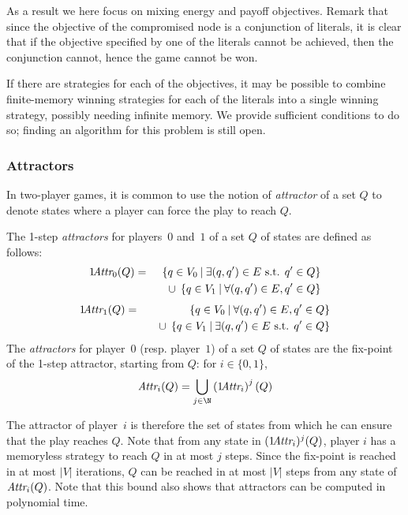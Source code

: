 As a result we here focus on mixing energy and payoff objectives.
Remark that since the objective of the compromised node is a conjunction of literals, it is clear that if the objective specified by one of the literals cannot be achieved, then the conjunction cannot, hence the game cannot be won.

If there are strategies for each of the objectives, it may be possible to combine finite-memory winning strategies for each of the literals into a single winning strategy, possibly needing infinite memory.
We provide sufficient conditions to do so; finding an algorithm for this problem is still open.

\subsubsection{Attractors}

In two-player games, it is common to use the notion of \emph{attractor} of a set $Q$ to denote states where a player can force the play to reach $Q$.

\begin{definition}
The 1-step \emph{attractors} for players~$0$ and~$1$ of a set $Q$ of states are defined as follows:
\begin{eqnarray*}
1\!\textit{Attr}_{0}(Q) &=& \left\{q \in V_0 \:\middle|\: \exists (q,q') \in E \textrm{ s.t. } q' \in Q \right\}
\\&&\quad
\cup \;\left\{q \in V_1 \:\middle|\: \forall (q,q') \in E, q' \in Q \right\}
\end{eqnarray*}
\begin{eqnarray*}
1\!\textit{Attr}_{1}(Q) &=& \left\{q \in V_0 \:\middle|\: \forall (q,q') \in E, q' \in Q \right\}
\\&&\quad
\cup \;\left\{q \in V_1 \:\middle|\: \exists (q,q') \in E \textrm{ s.t. } q' \in Q \right\}
\end{eqnarray*}
The \emph{attractors} for player~$0$ (resp. player~$1$) of a set $Q$ of states are the fix-point of the 1-step attractor, starting from $Q$: for $i \in \{0,1\}$,
\[\attractor{i}(Q) = \bigcup_{j \in \N} \left(1\!\attractor{i}\right)^j(Q)\]
\end{definition}
The attractor of player~$i$ is therefore the set of states from which he can ensure that the play reaches $Q$.
Note that from any state in $(1\!\textit{Attr}_{i})^j(Q)$, player $i$ has a memoryless strategy to reach $Q$ in at most $j$ steps.
Since the fix-point is reached in at most $|V|$ iterations, $Q$ can be reached in at most $|V|$ steps from any state of $\textit{Attr}_{i}(Q)$.
Note that this bound also shows that attractors can be computed in polynomial time.

